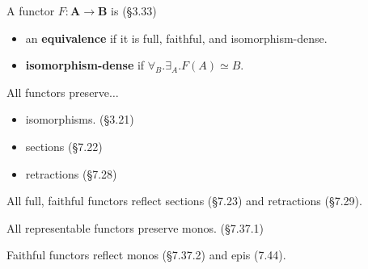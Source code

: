 \documentclass[10pt,twocolumn,letterpaper]{article}
\newcommand{\defn}[1]{{\bf #1}}
\begin{document}
  A functor $F : \mathbf{A} \to \mathbf{B}$ is (\S3.33)
  \begin{itemize}  
    \item an \defn{equivalence} if it is full, faithful, and
      isomorphism-dense.
    \item \defn{isomorphism-dense} if $\forall_B . \exists_A . F(A) \simeq B$.
  \end{itemize}

  All functors preserve$\dots$
    \begin{itemize}
      \item isomorphisms. (\S3.21)
      \item sections (\S7.22)
      \item retractions (\S7.28)
    \end{itemize}

  All full, faithful functors reflect sections (\S7.23) and retractions
  (\S7.29).

  All representable functors preserve monos. (\S7.37.1)

  Faithful functors reflect monos (\S7.37.2) and epis (7.44).
\end{document}
